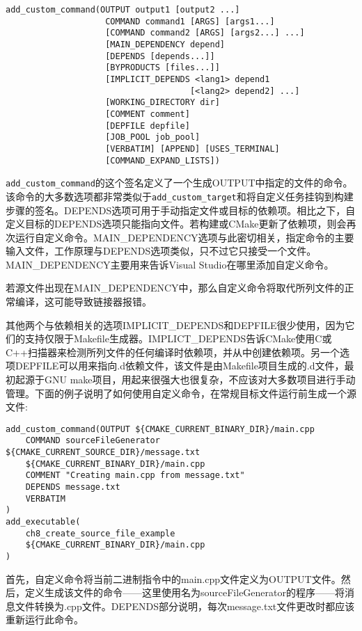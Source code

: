 \begin{lstlisting}[style=styleCMake]
add_custom_command(OUTPUT output1 [output2 ...]
					COMMAND command1 [ARGS] [args1...]
					[COMMAND command2 [ARGS] [args2...] ...]
					[MAIN_DEPENDENCY depend]
					[DEPENDS [depends...]]
					[BYPRODUCTS [files...]]
					[IMPLICIT_DEPENDS <lang1> depend1
									 [<lang2> depend2] ...]
					[WORKING_DIRECTORY dir]
					[COMMENT comment]
					[DEPFILE depfile]
					[JOB_POOL job_pool]
					[VERBATIM] [APPEND] [USES_TERMINAL]
					[COMMAND_EXPAND_LISTS])
\end{lstlisting}

\texttt{add\_custom\_command}的这个签名定义了一个生成OUTPUT中指定的文件的命令。该命令的大多数选项都非常类似于\texttt{add\_custom\_target}和将自定义任务挂钩到构建步骤的签名。DEPENDS选项可用于手动指定文件或目标的依赖项。相比之下，自定义目标的DEPENDS选项只能指向文件。若构建或CMake更新了依赖项，则会再次运行自定义命令。MAIN\_DEPENDENCY选项与此密切相关，指定命令的主要输入文件，工作原理与DEPENDS选项类似，只不过它只接受一个文件。MAIN\_DEPENDENCY主要用来告诉Visual Studio在哪里添加自定义命令。

\begin{tcolorbox}[colback=webgreen!5!white,colframe=webgreen!75!black,title=Note]
若源文件出现在MAIN\_DEPENDENCY中，那么自定义命令将取代所列文件的正常编译，这可能导致链接器报错。
\end{tcolorbox}

其他两个与依赖相关的选项IMPLICIT\_DEPENDS和DEPFILE很少使用，因为它们的支持仅限于Makefile生成器。IMPLICT\_DEPENDS告诉CMake使用C或C++扫描器来检测所列文件的任何编译时依赖项，并从中创建依赖项。另一个选项DEPFILE可以用来指向.d依赖文件，该文件是由Makefile项目生成的.d文件，最初起源于GNU make项目，用起来很强大也很复杂，不应该对大多数项目进行手动管理。下面的例子说明了如何使用自定义命令，在常规目标文件运行前生成一个源文件:

\begin{lstlisting}[style=styleCMake]
add_custom_command(OUTPUT ${CMAKE_CURRENT_BINARY_DIR}/main.cpp
	COMMAND sourceFileGenerator ${CMAKE_CURRENT_SOURCE_DIR}/message.txt
	${CMAKE_CURRENT_BINARY_DIR}/main.cpp
	COMMENT "Creating main.cpp from message.txt"
	DEPENDS message.txt
	VERBATIM
)
add_executable(
	ch8_create_source_file_example
	${CMAKE_CURRENT_BINARY_DIR}/main.cpp
)
\end{lstlisting}

首先，自定义命令将当前二进制指令中的main.cpp文件定义为OUTPUT文件。然后，定义生成该文件的命令——这里使用名为sourceFileGenerator的程序——将消息文件转换为.cpp文件。DEPENDS部分说明，每次message.txt文件更改时都应该重新运行此命令。

